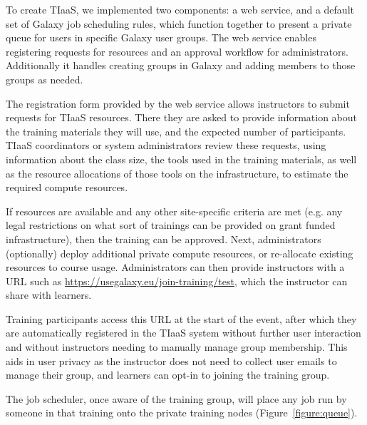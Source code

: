 \documentclass[a4paper,num-refs]{oup-contemporary}
\begin{document}
To create TIaaS, we implemented two components: a web service, and a default set of Galaxy job scheduling rules, which function together to present a private queue for users in specific Galaxy user groups. The web service enables registering requests for resources and an approval workflow for administrators. Additionally it handles creating groups in Galaxy and adding members to those groups as needed.

The registration form provided by the web service allows instructors to submit requests for TIaaS resources. There they are asked to provide information about the training materials they will use, and the expected number of participants. TIaaS coordinators or system administrators review these requests, using information about the class size, the tools used in the training materials, as well as the resource allocations of those tools on the infrastructure, to estimate the required compute resources.

If resources are available and any other site-specific criteria are met (e.g. any legal restrictions on what sort of trainings can be provided on grant funded infrastructure), then the training can be approved. Next, administrators (optionally) deploy additional private compute resources, or re-allocate existing resources to course usage. Administrators can then provide instructors with a URL such as \url{https://usegalaxy.eu/join-training/test}, which the instructor can share with learners.

Training participants access this URL at the start of the event, after which they are automatically registered in the TIaaS system without further user interaction and without instructors needing to manually manage group membership. This aids in user privacy as the instructor does not need to collect user emails to manage their group, and learners can opt-in to joining the training group.

The job scheduler, once aware of the training group, will place any job run by someone in that training onto the private training nodes (Figure~\ref{figure:queue}).
\end{document}

